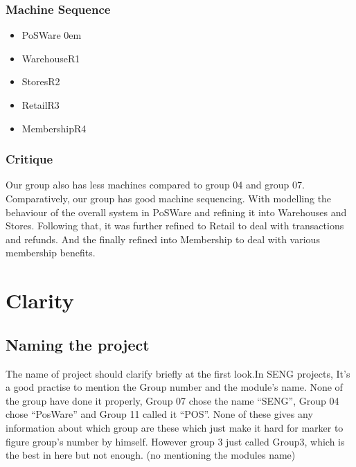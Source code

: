 \subsubsection{Machine Sequence}
\label{machinesequence}

\begin{itemize}
\item PoSWare
 \itemsep0em 

\item WarehouseR1

\item StoresR2

\item RetailR3

\item MembershipR4

\end{itemize}

\subsubsection{Critique}
\label{critique}

Our group also has less machines compared to group 04 and group 07. Comparatively, our group has good machine sequencing. With modelling the behaviour of the overall system in PoSWare and refining it into Warehouses and Stores. Following that, it was further refined to Retail to deal with transactions and refunds. And the finally refined into Membership to deal with various membership benefits.

\section{Clarity}
\label{clarity}

\subsection{Naming the project}
\label{namingtheproject}

The name of project should clarify briefly at the first look.In SENG projects, It's a good practise to mention the Group number and the module's name. None of the group have done it properly, Group 07 chose the name “SENG”, Group 04 chose “PosWare” and Group 11 called it “POS”. None of these gives any information about which group are these which just make it hard for marker to figure group's number by himself. However group 3 just called Group3, which is the best in here but not enough. (no mentioning the modules name)

